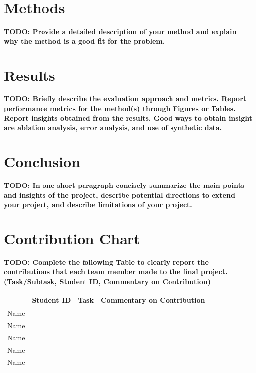 \documentclass{article}
\theoremstyle{plain}
\theoremstyle{definition}
\theoremstyle{remark}
\begin{document}
\section{Methods}
\textbf{TODO: Provide a detailed description of your method and explain why the method is a good fit for
the problem.}

\section{Results}
\textbf{TODO: Briefly describe the evaluation approach and metrics. Report performance metrics for the method(s) through Figures or Tables.
Report insights obtained from the results. Good ways to obtain insight are ablation analysis, error
analysis, and use of synthetic data.}

\section{Conclusion}
\textbf{TODO: In one short paragraph concisely summarize the main points and insights of the project,
describe potential directions to extend your project, and describe limitations of your project.}

\section{Contribution Chart}
\textbf{TODO: Complete the following Table to clearly report the contributions that each team
member made to the final project. (Task/Subtask, Student ID, Commentary on Contribution)}

\begin{table}[!h]
    \centering
    \begin{tabular}{| c || c | c | c |}
        \hline
        & Student ID & Task & Commentary on Contribution \\
        \hline
        Name & & & \\
        \hline
        Name & & & \\
        \hline
        Name & & & \\
        \hline
        Name & & & \\
        \hline
        Name & & & \\
        \hline
    \end{tabular}
\end{table}
\end{document}
